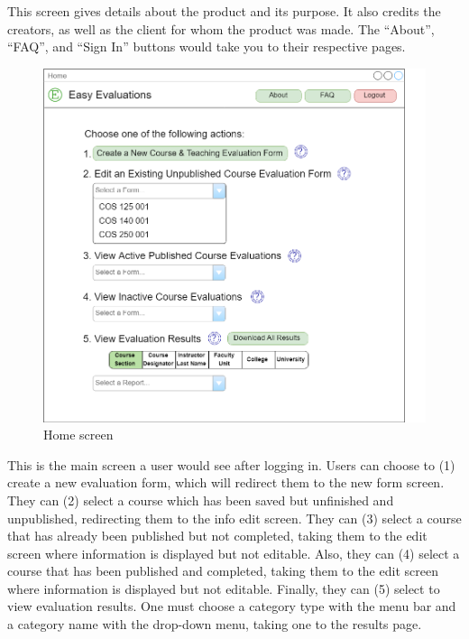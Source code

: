 \documentclass{article}
\begin{document}
This screen gives details about the product and its purpose. It also credits the creators, as well as the client for whom the product was made. The ``About'', ``FAQ'', and ``Sign In'' buttons would take you to their respective pages.

\newpage

\begin{center}
\begin{figure}[H]
    \centering
    \caption{Home screen}
    \includegraphics[width=6.5in]{images/home_screen.png}
\end{figure}
\end{center}

This is the main screen a user would see after logging in. Users can choose to (1) create a new evaluation form, which will redirect them to the new form screen. They can (2) select a course which has been saved but unfinished and unpublished, redirecting them to the info edit screen. They can (3) select a course that has already been published but not completed, taking them to the edit screen where information is displayed but not editable. Also, they can  (4) select a course that has been published and completed, taking them to the edit screen where information is displayed but not editable. Finally, they can (5) select to view evaluation results. One must choose a category type with the menu bar and a category name with the drop-down menu, taking one to the results page.
\end{document}
